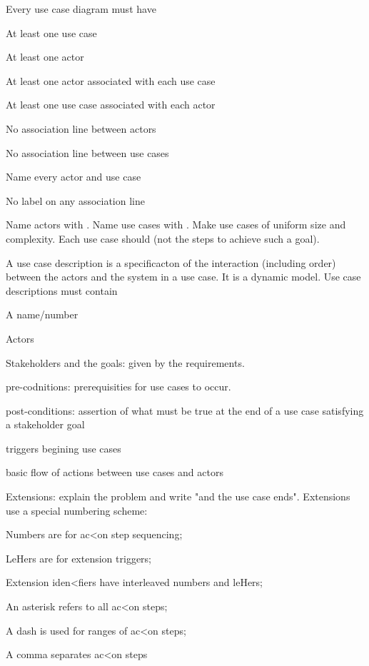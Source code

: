 \begin{compactitem}
\item Every use case diagram must have
\begin{compactitem}
\item At least one use case
\item At least one actor
\item At least one actor associated with each use case
\item At least one use case associated with each actor
\item No association line between actors
\item No association line between use cases
\item Name every actor and use case
\item No label on any association line
\end{compactitem}

\item Name actors with .
Name use cases with . Make use cases of uniform size and complexity. Each use case should  (not the steps to achieve such a goal).

\item A
use case description
is a specificacton of the interaction (including order) between
the actors and the system in a use case. It is a dynamic model. Use case descriptions must contain 
\begin{compactitem}
\item A name/number
\item Actors
\item Stakeholders and the goals: given by the requirements.
\item pre-codnitions: prerequisities for use cases to occur.
\item post-conditions: assertion of what must be true at the end of a use case satisfying a stakeholder goal
\item triggers begining use cases
\item basic flow of actions between use cases and actors
\item Extensions: explain the problem and write "and the use case ends". Extensions use a special numbering scheme:
\begin{compactitem}
\item Numbers are for ac<on step sequencing;
\item LeHers are for extension triggers;
\item Extension iden<fiers have interleaved numbers and leHers;
\item An asterisk refers to all ac<on steps;
\item A dash is used for ranges of ac<on steps;
\item A comma separates ac<on steps
\end{compactitem}
\end{compactitem}


\end{compactitem}
